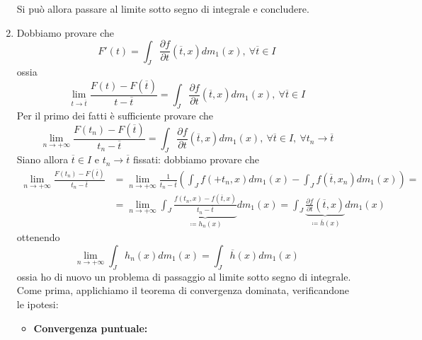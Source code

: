 \begin{demonstration}
\begin{enumerate}[label=\Roman*]
\begin{itemize}
\begin{equation*}
			\end{equation*}
		\end{itemize}
		Si può allora passare al limite sotto segno di integrale e concludere.
		\item Dobbiamo provare che
		\begin{equation*}
			F'\left(t\right)=\int_J\frac{\partial f}{\partial t}\left(\overline{t},x\right)dm_1\left(x\right),\ \forall \overline{t}\in I
		\end{equation*}
		ossia
		\begin{equation*}
			\lim_{t\to\overline{t}}\frac{F\left(t\right)-F\left(\overline{t}\right)}{t-\overline{t}}=\int_J\frac{\partial f}{\partial t}\left(\overline{t},x\right)dm_1\left(x\right),\ \forall \overline{t}\in I
		\end{equation*}
		Per il primo dei fatti è sufficiente provare che
		\begin{equation*}
			\lim_{n\to+\infty}\frac{F\left(t_n\right)-F\left(\overline{t}\right)}{t_n-\overline{t}}=\int_J\frac{\partial f}{\partial t}\left(\overline{t},x\right)dm_1\left(x\right),\ \forall \overline{t}\in I,\ \forall t_n\to \overline{t}
		\end{equation*}
		Siano allora $\overline{t}\in I$ e $t_n\to\overline{t}$ fissati: dobbiamo provare che
		\begin{align*}
			\lim_{n\to+\infty}\frac{F\left(t_n\right)-F\left(\overline{t}\right)}{t_n-\overline{t}}&=\lim_{n\to+\infty}\frac{1}{t_n-\overline{t}}\left(\int_Jf\left(+t_n,x\right)dm_1\left(x\right)-\int_Jf\left(\overline{t},x_n\right)dm_1\left(x\right)\right)=\\
			&=\lim_{n\to+\infty}\int_J\underbrace{\frac{f\left(t_n,x\right)-f\left(\overline{t},x\right)}{t_n-\overline{t}}}_{\coloneqq h_n\left(x\right)}dm_1\left(x\right)=\int_J\underbrace{\frac{\partial f}{\partial t}\left(\overline{t},x\right)}_{\coloneqq \overline{h}\left(x\right)}dm_1\left(x\right)
		\end{align*}
		ottenendo
		\begin{equation*}
			\lim_{n\to+\infty}\int_Jh_n\left(x\right)dm_1\left(x\right)=\int_J\overline{h}\left(x\right)dm_1\left(x\right)
		\end{equation*}
		ossia ho di nuovo un problema di passaggio al limite sotto segno di integrale. Come prima, applichiamo il teorema di convergenza dominata, verificandone le ipotesi:
		\begin{itemize}
			\item \textbf{Convergenza puntuale:}
			\begin{equation*}

\end{equation*}
\end{itemize}
\end{enumerate}
\end{demonstration}
